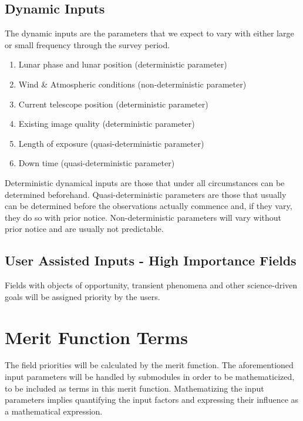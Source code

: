 \documentclass{article}
\begin{document}
\subsection{Dynamic Inputs}
The dynamic inputs are the parameters that we expect to vary with either large or small frequency through the survey period.
\begin{enumerate}
	\item Lunar phase and lunar position (deterministic parameter)\\
	\item Wind \&{} Atmospheric conditions (non-deterministic parameter)\\
	\item Current telescope position (deterministic parameter)\\
	\item Existing image quality (deterministic parameter)\\
	\item Length of exposure (quasi-deterministic parameter)\\
	\item Down time (quasi-deterministic parameter)\\
\end{enumerate}
Deterministic dynamical inputs are those that under all circumstances can be determined beforehand. Quasi-deterministic parameters are those that usually can be determined before the observations actually commence and, if they vary, they do so with prior notice. Non-deterministic parameters will vary without prior notice and are usually not predictable.

\subsection{User Assisted Inputs - High Importance Fields}
Fields with objects of opportunity, transient phenomena and other science-driven goals will be assigned priority by the users.

\section{Merit Function Terms}
The field priorities will be calculated by the merit function. The aforementioned input parameters will be handled by submodules in order to be mathematicized, to be included as terms in this merit function. Mathematizing the input parameters implies quantifying the input factors and expressing their influence as a mathematical expression.
\end{document}
